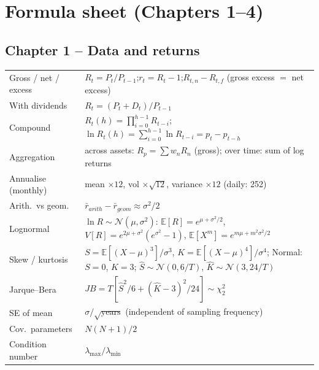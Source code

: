\documentclass[11pt,a4paper]{report}
\newcommand{\E}{\mathbb{E}}
\begin{document}

\chapter{Formula sheet (Chapters 1--4)}
\label{ch:formulas}
{\small
\section*{Chapter 1 -- Data and returns}
\begin{tabularx}{\textwidth}{@{}lX@{}}
\toprule
Gross / net / excess & $R_t=P_t/P_{t-1}$;\quad $r_t=R_t-1$;\quad $R_{t,n}-R_{t,f}$ (gross excess $=$ net excess) \\
With dividends & $R_t=(P_t+D_t)/P_{t-1}$ \\
Compound & $R_t(h)=\prod_{i=0}^{h-1}R_{t-i}$;\quad $\ln R_t(h)=\sum_{i=0}^{h-1}\ln R_{t-i}=p_t-p_{t-h}$ \\
Aggregation & across assets: $R_p=\sum w_nR_n$ (gross); over time: sum of log returns \\
Annualise (monthly) & mean $\times12$, vol $\times\sqrt{12}$, variance $\times12$ (daily: 252) \\
Arith.\ vs geom.\ & $\bar r_{arith}-\bar r_{geom}\approx\sigma^2/2$ \\
Lognormal & $\ln R\sim\mathcal N(\mu,\sigma^2)$: $\E[R]=e^{\mu+\sigma^2/2}$, $V[R]=e^{2\mu+\sigma^2}(e^{\sigma^2}-1)$, $\E[X^m]=e^{m\mu+m^2\sigma^2/2}$ \\
Skew / kurtosis & $S=\E[(X-\mu)^3]/\sigma^3$, $K=\E[(X-\mu)^4]/\sigma^4$; Normal: $S=0$, $K=3$; $\hat S\sim\mathcal N(0,6/T)$, $\hat K\sim\mathcal N(3,24/T)$ \\
Jarque--Bera & $JB=T[\hat S^2/6+(\hat K-3)^2/24]\sim\chi^2_2$ \\
SE of mean & $\sigma/\sqrt{\text{years}}$ (independent of sampling frequency) \\
Cov.\ parameters & $N(N+1)/2$ \\
Condition number & $\lambda_{\max}/\lambda_{\min}$ \\
\bottomrule
\end{tabularx}

}
\end{document}
